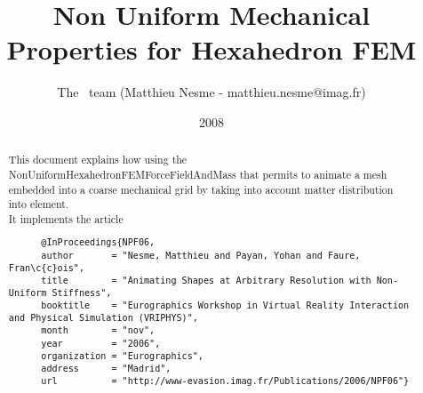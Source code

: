 \documentclass[a4paper,11pt]{article}
\title{Non Uniform Mechanical Properties for Hexahedron FEM}
\author{The \sofa~team (Matthieu Nesme - matthieu.nesme@imag.fr)}
\date{2008}
\begin{document}
 
\maketitle

\begin{abstract}
This document explains how using the NonUniformHexahedronFEMForceFieldAndMass that permits to animate a mesh embedded into a coarse mechanical grid by taking into account matter distribution into element.
\\It implements the article

\begin{verbatim}
      @InProceedings{NPF06,
      author       = "Nesme, Matthieu and Payan, Yohan and Faure, Fran\c{c}ois",
      title        = "Animating Shapes at Arbitrary Resolution with Non-Uniform Stiffness",
      booktitle    = "Eurographics Workshop in Virtual Reality Interaction and Physical Simulation (VRIPHYS)",
      month        = "nov",
      year         = "2006",
      organization = "Eurographics",
      address      = "Madrid",
      url          = "http://www-evasion.imag.fr/Publications/2006/NPF06"}
 \end{verbatim}
 
\end{abstract}

\tableofcontents
\newpage

\end{document}
